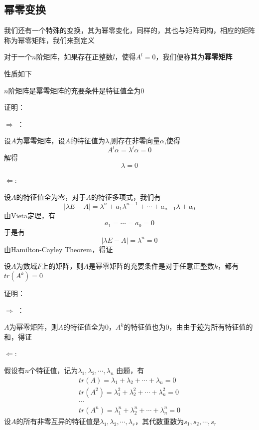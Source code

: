 \documentclass[lang=cn,10pt]{elegantbook}
\begin{document}
\subsection{幂零变换}
我们还有一个特殊的变换，其为幂零变化，同样的，其也与矩阵同构，相应的矩阵称为幂零矩阵，我们来到定义
\begin{definition}[幂零矩阵]
	对于一个$n$阶矩阵，如果存在正整数$l$，使得$A^{l}=0$，我们便称其为\textbf{幂零矩阵}
\end{definition}
性质如下
\begin{example}
	$n$阶矩阵是幂零矩阵的充要条件是特征值全为0
\end{example}
证明：

$\Rightarrow$ ：

设$A$为幂零矩阵，设$A$的特征值为$\lambda$,则存在非零向量$\alpha$,使得
\begin{equation*}
	A^{l}\alpha=\lambda^{l}\alpha=0
\end{equation*}
解得
\begin{equation*}
	\lambda=0
\end{equation*}

$\Leftarrow$:

设$A$的特征值全为零，对于$A$的特征多项式，我们有
\begin{equation*}
	|\lambda E-A|=\lambda^{n}+a_{1}\lambda^{n-1}+\cdots+a_{n-1}\lambda+a_{0}
\end{equation*}
由Vieta定理，有
\begin{equation*}
	a_{1}=\cdots=a_{0}=0
\end{equation*}
于是有
\begin{equation*}
	|\lambda E-A|=\lambda^{n}=0
\end{equation*}
由Hamilton-Cayley Theorem，得证
\begin{example}
	设$A$为数域$F$上的矩阵，则$A$是幂零矩阵的充要条件是对于任意正整数$k$，都有$tr(A^{k})=0$
\end{example}
证明：

$\Rightarrow$ ：

$A$为幂零矩阵，则$A$的特征值全为0，$A^{k}$的特征值也为0，由由于迹为所有特征值的和，得证

$\Leftarrow$:

假设有$n$个特征值，记为$\lambda_{1},\lambda_{2},\cdots,\lambda_{n}$
由题，有
\begin{equation*}
	\begin{split}
		tr(A)=\lambda_{1}+\lambda_{2}+\cdots+\lambda_{n}=0
		\\
		tr(A^{2})=\lambda_{1}^{2}+\lambda_{2}^{2}+\cdots+\lambda_{n}^{2}=0
		\\
		\cdots
		\\
		tr(A^{n})=\lambda_{1}^{n}+\lambda_{2}^{n}+\cdots+\lambda_{n}^{n}=0
	\end{split}
\end{equation*}
设$A$的所有非零互异的特征值是$\lambda_{1},\lambda_{2},\cdots,\lambda_{r}$，其代数重数为$s_{1},s_{2},\cdots,s_{r}$
\end{document}
